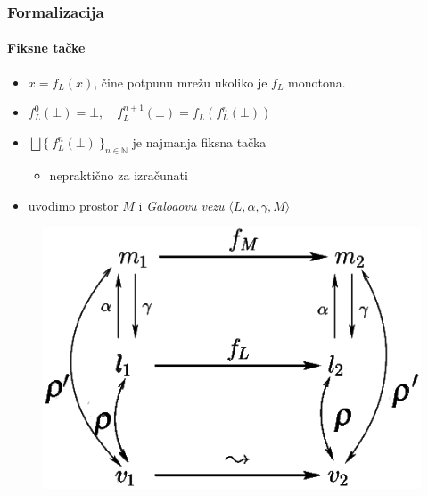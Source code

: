 \documentclass[xetex,mathserif,serif]{beamer}
\begin{document}
  \begin{frame}
    \frametitle{Formalizacija}
    \framesubtitle{Fiksne tačke}
	\begin{center}
		\begin{itemize}
			\item $x = f_{L}(x)$, \pause čine potpunu mrežu ukoliko je $f_{L}$ monotona.\pause
			\item $f^{0}_{L}(\bot) = \bot, \quad f^{n+1}_{L}(\bot) = f_{L}(f^{n}_{L}(\bot))$ \pause
			\item $\bigsqcup \{ \: f^{n}_{L}(\bot)\: \}_{n \in \mathbb{N}}$ je najmanja fiksna tačka \pause
			\begin{itemize}
				\item nepraktično za izračunati			\pause
			\end{itemize}
			\item uvodimo prostor $M$ i \emph{Galoaovu vezu}  $\langle L, \alpha, \gamma, M \rangle$
		\end{itemize}
		\begin{figure}
			\includegraphics[scale=0.3,left]{Rho_prime.png}
		\end{figure}
		\end{center}
  \end{frame}
\end{document}
